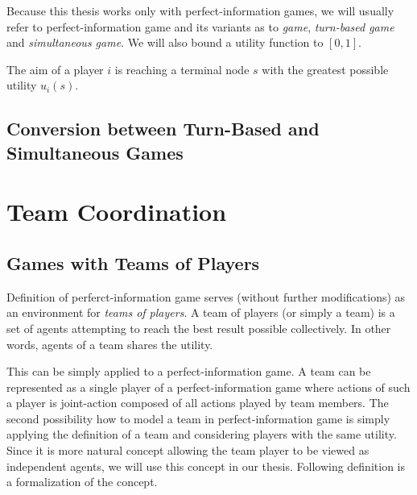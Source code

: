 Because this thesis works only with perfect-information games, we will usually refer to
perfect-information game and its variants as to \emph{game}, \emph{turn-based game} and
\emph{simultaneous game}. We will also bound a utility function to $[0,1]$.

The aim of a player $i$ is reaching a terminal node $s$ with the greatest possible utility
$u_i(s)$.

\subsection{Conversion between Turn-Based and Simultaneous Games}
\label{sec_turn_based_game_conversion}


\section{Team Coordination}

\subsection{Games with Teams of Players}

Definition of perferct-information game serves (without further modifications) as an
environment for \emph{teams of players}. A team of players (or simply a team) is a set of agents
attempting to reach the best result possible collectively. In other words, agents of a team
shares the utility. 

This can be simply applied to a perfect-information game. A team can be represented as a single
player of a perfect-information game where actions of such a player is joint-action composed of
all actions played by team members. The second possibility how to model a team in
perfect-information game is simply applying the definition of a team and considering players
with the same utility. Since it is more natural concept allowing the team player to be viewed as
independent agents, we will use this concept in our thesis. Following definition is a
formalization of the concept.


